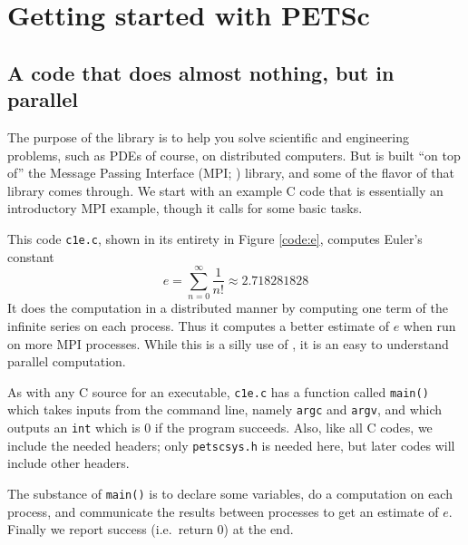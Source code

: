 
\chapter{Getting started with PETSc}
\label{chap:getstarted}

\section{A code that does almost nothing, but in parallel}

The purpose of the \PETSc library is to help you solve scientific and engineering problems, such as PDEs of course, on distributed computers.  But \PETSc is built ``on top of'' the Message Passing Interface (MPI; \citep{Groppetal1999}) library, and some of the flavor of that library comes through.  We start with an example C code that is essentially an introductory MPI example, though it calls \PETSc for some basic tasks.

This code \texttt{c1e.c}, shown in its entirety in Figure \ref{code:e}, computes Euler's constant
\begin{equation}
e = \sum_{n = 0}^\infty \frac{1}{n!} \approx 2.718281828 \label{introeseries}
\end{equation}
It does the computation in a distributed manner by computing one term of the infinite series on each process.  Thus it computes a better estimate of $e$ when run on more MPI processes. While this is a silly use of \PETSc, it is an easy to understand parallel computation.

As with any C source for an executable, \texttt{c1e.c} has a function called \texttt{main()} which takes inputs from the command line, namely \texttt{argc} and \texttt{argv}, and which outputs an \texttt{int} which is $0$ if the program succeeds.  Also, like all C codes, we include the needed headers; only \texttt{petscsys.h} is needed here, but later codes will include other \PETSc headers.

The substance of \texttt{main()} is to declare some variables, do a computation on each process, and communicate the results between processes to get an estimate of $e$.  Finally we report success (i.e.~return $0$) at the end.

